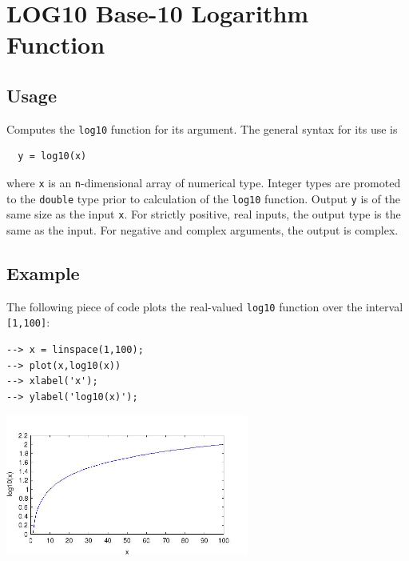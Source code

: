\section{LOG10 Base-10 Logarithm Function}

\subsection{Usage}

Computes the \verb|log10| function for its argument.  The general
syntax for its use is
\begin{verbatim}
  y = log10(x)
\end{verbatim}
where \verb|x| is an \verb|n|-dimensional array of numerical type.
Integer types are promoted to the \verb|double| type prior to
calculation of the \verb|log10| function.  Output \verb|y| is of the
same size as the input \verb|x|. For strictly positive, real inputs, 
the output type is the same as the input.
For negative and complex arguments, the output is complex.
\subsection{Example}

The following piece of code plots the real-valued \verb|log10|
function over the interval \verb|[1,100]|:
\begin{verbatim}
--> x = linspace(1,100);
--> plot(x,log10(x))
--> xlabel('x');
--> ylabel('log10(x)');
\end{verbatim}


\centerline{\includegraphics[width=8cm]{log10plot}}

